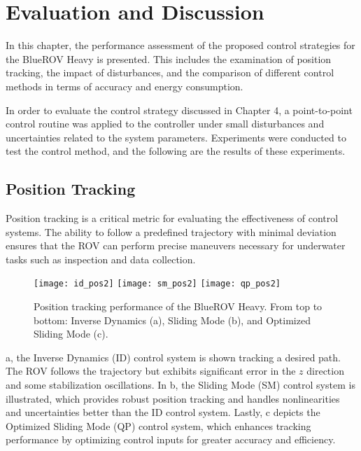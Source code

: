 \chapter{Evaluation and Discussion}
\label{chap:eval}

    In this chapter, the performance assessment of the proposed control strategies for the BlueROV Heavy is presented. This includes the examination of position tracking, the impact of disturbances, and the comparison of different control methods in terms of accuracy and energy consumption.

    In order to evaluate the control strategy discussed in Chapter 4, a point-to-point control routine was applied to the controller under small disturbances and uncertainties related to the system parameters. Experiments were conducted to test the control method, and the following are the results of these experiments.

\section{Position Tracking}

    Position tracking is a critical metric for evaluating the effectiveness of control systems. The ability to follow a predefined trajectory with minimal deviation ensures that the ROV can perform precise maneuvers necessary for underwater tasks such as inspection and data collection.

    \begin{figure}[h]
        \centering
        \texttt{[image: id\_pos2]}
        \texttt{[image: sm\_pos2]}
        \texttt{[image: qp\_pos2]}
        \caption{Position tracking performance of the BlueROV Heavy. From top to bottom: Inverse Dynamics (a), Sliding Mode (b), and Optimized Sliding Mode (c).}
        \label{image:pos_tracking}
    \end{figure}

    a, the Inverse Dynamics (ID) control system is shown tracking a desired path. The ROV follows the trajectory but exhibits significant error in the $z$ direction and some stabilization oscillations. In b, the Sliding Mode (SM) control system is illustrated, which provides robust position tracking and handles nonlinearities and uncertainties better than the ID control system. Lastly, c depicts the Optimized Sliding Mode (QP) control system, which enhances tracking performance by optimizing control inputs for greater accuracy and efficiency.

